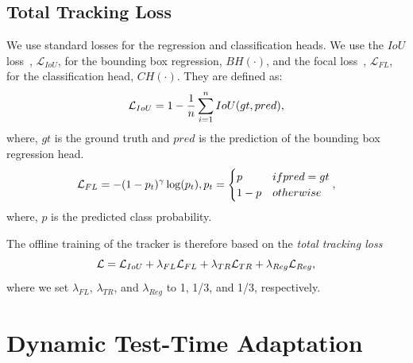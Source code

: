 \subsection{Total Tracking Loss} 
We use standard losses for the regression and classification heads. We use the $IoU$ loss~\cite{rezatofighi2019generalized}, $\mathcal{L}_{IoU}$, for the bounding box regression, $BH(\cdot)$, and the focal loss~\cite{lin2017focal}, $\mathcal{L}_{FL}$, for the classification head, $CH(\cdot)$.
They are defined as:
\begin{equation}
  \centering
  \label{eq:iou}
      \begin{aligned} 
          \mathcal{L}_{IoU} = 1 -  \frac{1}{n} \sum^{n}_{i=1} IoU(gt,pred),
      \end{aligned}
\end{equation}
where, $gt$ is the ground truth and $pred$ is the prediction of the bounding box regression head.
\begin{equation}
  \centering
  \label{eq:focal}
      \begin{aligned}
          \mathcal{L}_{FL} =  -(1-p_t)^\gamma \log(p_t),  p_t= \begin{cases} p & if \text{\break } pred=gt\\ 1-p & otherwise \end{cases}  ,
      \end{aligned}
\end{equation}
where, $p$ is the predicted class probability.

The offline training of the tracker is therefore based on the \emph{total tracking loss}
\begin{equation} \small
  \centering
  \label{eq:overall_loss}
          \mathcal{L} =  \mathcal{L}_{IoU} + \lambda_{FL} \mathcal{L}_{FL} + \lambda_{TR} \mathcal{L}_{TR} + \lambda_{Reg} \mathcal{L}_{Reg},
\end{equation}
where we set $\lambda_{FL}$, $\lambda_{TR}$, and $\lambda_{Reg}$ to 1, 1/3, and 1/3, respectively.

\section{Dynamic Test-Time Adaptation} \label{sec:methods_tta}

